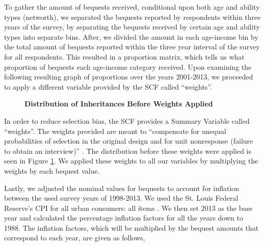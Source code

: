 \documentclass[letterpaper,12pt]{article}
\newcommand{\quotes}[1]{``#1''}
\theoremstyle{definition}
\begin{document}
\begin{spacing}{1.5}
 To gather the amount of bequests received, conditional upon both age and ability types (networth), we separated the bequests reported by respondents within three years of the survey, by separating the bequests received by certain age and ability types into separate bins. After, we divided the amount in each age-income bin by the total amount of bequests reported within the three year interval of the survey for all respondents. This resulted in a proportion matrix, which tells us what proportion of bequests each age-income category received. Upon examining the following resulting graph of proportions over the years 2001-2013, we proceeded to apply a different variable provided by the SCF called \quotes{weights}.

\begin{figure}[htbp]\centering \captionsetup{width=5.5in}
    \caption{\label{Weightfig}\textbf{Distribution of Inheritances Before Weights Applied}}
  \end{figure}
\newpage

 In order to reduce selection bias, the SCF provides a Summary Variable called \quotes{weights}. The weights provided are meant to \quotes{compensate for unequal probabilities of selection in the original design and for unit nonresponse (failure to obtain an interview)} \citet{FEDweight}. The distribution before these weights were applied is seen in Figure \ref{Weightfig}. We applied these weights to all our variables by multiplying the weights by each bequest value.


Lastly, we adjusted the nominal values for bequests to account for inflation between the used survey years of 1998-2013. We used the St. Louis Federal Reserve's CPI for all urban consumers: all items \citet{StFed} . We then set 2013 as the base year and calculated the percentage inflation factors for all the years down to 1988. The inflation factors, which will be multiplied by the bequest amounts that correspond to each year, are given as follows,


\end{spacing}
\end{document}
